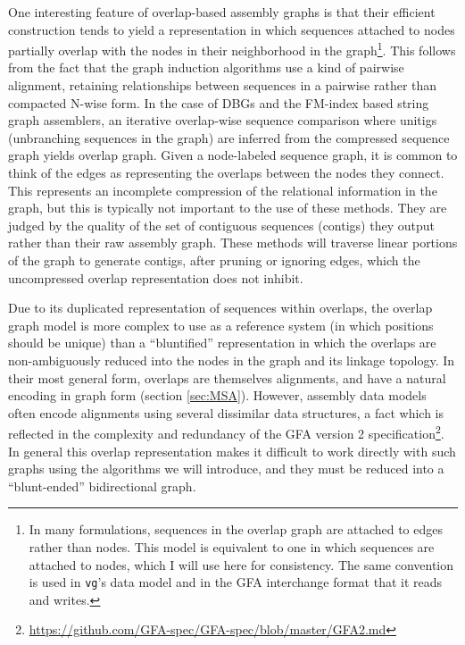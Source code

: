 \documentclass[a4paper,12pt,numbered,oneside]{Classes/PhDThesisPSnPDF}
\begin{document}
One interesting feature of overlap-based assembly graphs is that their efficient construction tends to yield a representation in which sequences attached to nodes partially overlap with the nodes in their neighborhood in the graph\footnote{In many formulations, sequences in the overlap graph are attached to edges rather than nodes. This model is equivalent to one in which sequences are attached to nodes, which I will use here for consistency. The same convention is used in {\tt vg}'s data model and in the GFA interchange format that it reads and writes.}.
This follows from the fact that the graph induction algorithms use a kind of pairwise alignment, retaining relationships between sequences in a pairwise rather than compacted N-wise form.
In the case of DBGs and the FM-index based string graph assemblers, an iterative overlap-wise sequence comparison where unitigs (unbranching sequences in the graph) are inferred from the compressed sequence graph yields overlap graph.
Given a node-labeled sequence graph, it is common to think of the edges as representing the overlaps between the nodes they connect.
This represents an incomplete compression of the relational information in the graph, but this is typically not important to the use of these methods.
They are judged by the quality of the set of contiguous sequences (contigs) they output rather than their raw assembly graph.
These methods will traverse linear portions of the graph to generate contigs, after pruning or ignoring edges, which the uncompressed overlap representation does not inhibit.

Due to its duplicated representation of sequences within overlaps, the overlap graph model is more complex to use as a reference system (in which positions should be unique) than a ``bluntified'' representation in which the overlaps are non-ambiguously reduced into the nodes in the graph and its linkage topology.
In their most general form, overlaps are themselves alignments, and have a natural encoding in graph form (section \ref{sec:MSA}).
However, assembly data models often encode alignments using several dissimilar data structures, a fact which is reflected in the complexity and redundancy of the GFA version 2 specification\footnote{\url{https://github.com/GFA-spec/GFA-spec/blob/master/GFA2.md}}.
In general this overlap representation makes it difficult to work directly with such graphs using the algorithms we will introduce, and they must be reduced into a ``blunt-ended'' bidirectional graph.

\end{document}
